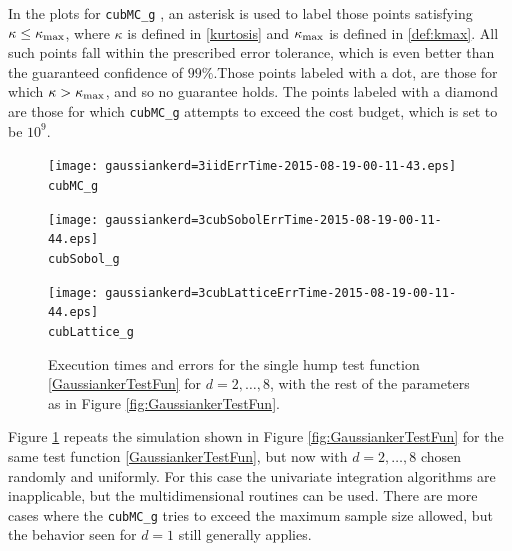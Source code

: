 \documentclass{iitthesis}
\begin{document}
In the plots for {\tt cubMC\_g} , an asterisk is used to label those points satisfying $\kappa \le \kappa_{\max}$, where $\kappa$ is defined in \eqref{kurtosis} and $\kappa_{\max}$ is defined in \eqref{def:kmax}. All such points fall within the prescribed error tolerance, which is even better than the guaranteed confidence of $99\%$.Those points labeled with a dot, are those for which $\kappa > \kappa_{\max}$, and so no guarantee holds. The points labeled with a diamond are those for which  {\tt cubMC\_g}  attempts to exceed the cost budget, which is set to be $10^{9}$.

\begin{figure}
\centering
\begin{minipage}{9cm} \centering \texttt{[image: gaussiankerd=3iidErrTime-2015-08-19-00-11-43.eps]} \\ {\tt cubMC\_g}  \end{minipage}
\begin{minipage}{7cm} \centering \texttt{[image: gaussiankerd=3cubSobolErrTime-2015-08-19-00-11-44.eps]} \\  {\tt cubSobol\_g}\end{minipage}
\begin{minipage}{7cm} \centering \texttt{[image: gaussiankerd=3cubLatticeErrTime-2015-08-19-00-11-44.eps]} \\ {\tt cubLattice\_g} \end{minipage}
\caption{Execution times and errors for the single hump test function \eqref{GaussiankerTestFun} for $d=2, \ldots, 8$, with the rest of the parameters as in Figure \ref{fig:GaussiankerTestFun}.\label{fig:GaussiankerHDTestFun} }
\end{figure}

Figure \ref{fig:GaussiankerHDTestFun} repeats the simulation shown in Figure \ref{fig:GaussiankerTestFun} for the same test function \eqref{GaussiankerTestFun}, but now with $d=2, \ldots, 8$ chosen randomly and uniformly.  For this case the univariate integration algorithms are inapplicable, but the multidimensional routines can be used.  There are more cases where the  {\tt cubMC\_g}  tries to exceed the maximum sample size allowed, but the behavior seen for $d=1$ still generally applies.  
\end{document}
